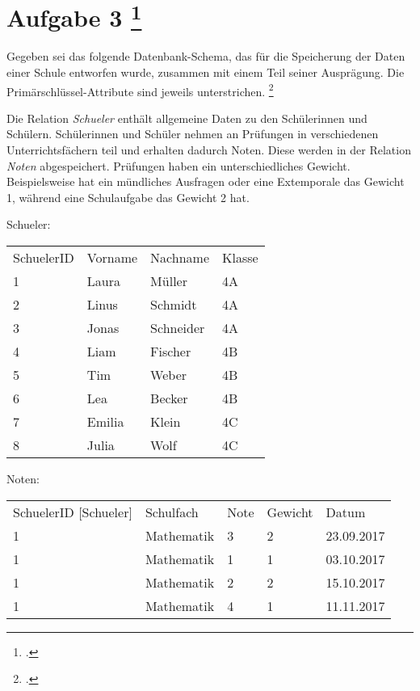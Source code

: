 \documentclass{lehramt-informatik-aufgabe}
\begin{document}
\section{Aufgabe 3
\footcite[Thema 2 Teilaufgabe 2 Aufgabe 3]{46116:2018:09}
}

Gegeben sei das folgende Datenbank-Schema, das für die Speicherung der
Daten einer Schule entworfen wurde, zusammen mit einem Teil seiner
Ausprägung. Die Primärschlüssel-Attribute sind jeweils unterstrichen.
\footcite{db:ab3}

Die Relation \emph{Schueler} enthält allgemeine Daten zu den
Schülerinnen und Schülern. Schülerinnen und Schüler nehmen an Prüfungen
in verschiedenen Unterrichtsfächern teil und erhalten dadurch Noten.
Diese werden in der Relation \emph{Noten} abgespeichert. Prüfungen haben
ein unterschiedliches Gewicht. Beispielsweise hat ein mündliches
Ausfragen oder eine Extemporale das Gewicht 1, während eine Schulaufgabe
das Gewicht 2 hat.

Schueler:

\begin{tabular}{llll}
SchuelerID & Vorname & Nachname  & Klasse \\
1        & Laura   & Müller    & 4A     \\
2        & Linus   & Schmidt   & 4A     \\
3        & Jonas   & Schneider & 4A     \\
4        & Liam    & Fischer   & 4B     \\
5        & Tim     & Weber     & 4B     \\
6        & Lea     & Becker    & 4B     \\
7        & Emilia  & Klein     & 4C     \\
8        & Julia   & Wolf      & 4C
\end{tabular}

Noten:

\begin{tabular}{lllll}
SchuelerID {[}Schueler{]} & Schulfach  & Note & Gewicht & Datum      \\
1                         & Mathematik & 3    & 2       & 23.09.2017 \\
1                         & Mathematik & 1    & 1       & 03.10.2017 \\
1                         & Mathematik & 2    & 2       & 15.10.2017 \\
1                         & Mathematik & 4    & 1       & 11.11.2017
\end{tabular}
\end{document}
